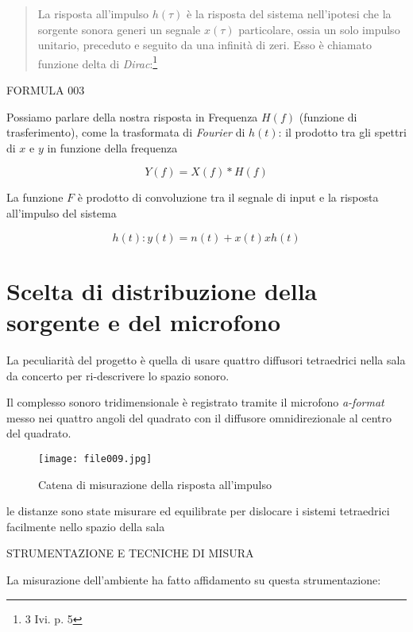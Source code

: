 \begin{quote}

La risposta all'impulso $h(\tau)$ è la risposta del sistema nell'ipotesi che la
sorgente sonora generi un segnale $x(\tau)$ particolare, ossia un solo impulso unitario,
preceduto e seguito da una infinità di zeri. Esso è chiamato funzione delta di \emph{Dirac}:\footnote{3 Ivi. p. 5} 

\end{quote}

FORMULA 003


Possiamo parlare della nostra risposta in Frequenza $H(f)$ (funzione di trasferimento),
come la  trasformata di \emph{Fourier} di $h(t)$: il prodotto tra gli spettri di $x$ e $y$ in funzione della frequenza

\begin{equation}
Y(f)= X(f)*H(f) 
\end{equation}

La funzione $F$ è prodotto di convoluzione tra il segnale di input e la risposta all'impulso del sistema

\begin{equation}
h(t):y(t)= n(t) + x(t) x h(t)
\end{equation}


\section{Scelta di distribuzione della sorgente e del microfono}

La peculiarità del progetto è quella di usare  quattro diffusori tetraedrici nella sala da concerto per ri-descrivere lo spazio sonoro.

Il complesso sonoro tridimensionale è registrato tramite il microfono \emph{a-format} messo nei quattro angoli del quadrato con il diffusore omnidirezionale al centro del quadrato. 

\begin{figure}
\centering
{\texttt{[image: file009.jpg]}}
\caption[Pianta S. Luca]{Catena di misurazione della risposta all'impulso}
\label{fig:tetratetra}
\end{figure}

le distanze sono state misurare ed equilibrate per dislocare i sistemi tetraedrici facilmente nello spazio della sala

STRUMENTAZIONE E TECNICHE DI MISURA

La misurazione dell'ambiente ha fatto affidamento su questa strumentazione:

